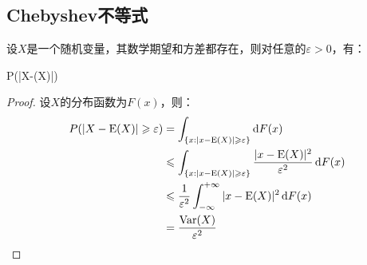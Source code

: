 \subsection{Chebyshev不等式}
\begin{theorem}
	设$X$是一个随机变量，其数学期望和方差都存在，则对任意的$\varepsilon>0$，有：
	\begin{inequality*}\label{ineq:Chebyshev}
		P(|X-(X)|\geqslant\varepsilon)\leqslant{}
	\end{inequality*}
\end{theorem}
\begin{proof}
	设$X$的分布函数为$F(x)$，则：
	\begin{align*}
		P(|X-\operatorname{E}(X)|\geqslant\varepsilon)
		&=\int_{\{x:|x-\operatorname{E}(X)|\geqslant\varepsilon\}}^{}\mathop{}\!\mathrm{d} F(x) \\
		&\leqslant\int_{\{x:|x-\operatorname{E}(X)|\geqslant\varepsilon\}}^{}\frac{|x-\operatorname{E}(X)|^2}{\varepsilon^2}\mathop{}\!\mathrm{d} F(x) \\
		&\leqslant\frac{1}{\varepsilon^2}\int_{-\infty}^{+\infty}|x-\operatorname{E}(X)|^2\mathop{}\!\mathrm{d} F(x) \\
		&=\frac{\operatorname{Var}(X)}{\varepsilon^2}\qedhere
	\end{align*}
\end{proof}
